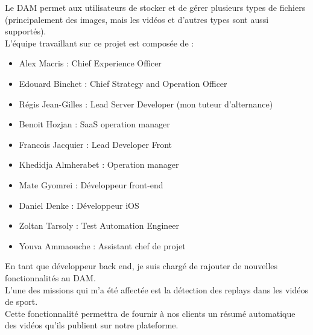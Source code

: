 \documentclass[11pt]{article}
\begin{document}
Le DAM permet aux utilisateurs de stocker et de gérer plusieurs types de fichiers (principalement des images, mais les vidéos et d’autres types sont aussi supportés).\\
L’équipe travaillant sur ce projet est composée de :\\
\begin{itemize}
\item Alex Macris : Chief Experience Officer\\
\item Edouard Binchet : Chief Strategy and Operation Officer\\
\item Régis Jean-Gilles : Lead Server Developer (mon tuteur d'alternance)\\
\item Benoit Hozjan : SaaS operation manager\\
\item Francois Jacquier : Lead Developer Front\\
\item Khedidja Almherabet : Operation manager\\
\item Mate Gyomrei : Développeur front-end\\
\item Daniel Denke : Développeur iOS\\
\item Zoltan Tarsoly : Test Automation Engineer\\
\item Youva Ammaouche : Assistant chef de projet\\
\end{itemize}

En tant que développeur back end, je suis chargé de rajouter de nouvelles fonctionnalités au DAM.\\
L'une des missions qui m'a été affectée est la détection des replays dans les vidéos de sport.\\
Cette fonctionnalité permettra de fournir à nos clients un résumé automatique des vidéos qu'ils publient sur notre plateforme.\\

\newpage
\end{document}
